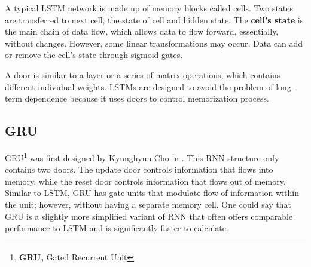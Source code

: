 A typical LSTM network is made up of memory blocks called cells. Two states are transferred to next cell, the state of cell and hidden state. The \textbf{cell's state} is the main chain of data flow, which allows data to flow forward, essentially, without changes. However, some linear transformations may occur. Data can add or remove the cell's state through sigmoid gates.

\vspace{5mm} %

A door is similar to a layer or a series of matrix operations, which contains different individual weights. LSTMs are designed to avoid the problem of long-term dependence because it uses doors to control memorization process.

\subsection{GRU}

GRU\footnote{\textbf{GRU, }Gated Recurrent Unit} was first designed by Kyunghyun Cho in \citeyear{Reference55}. This RNN structure only contains two doors. The update door controls information that flows into memory, while the reset door controls information that flows out of memory. Similar to LSTM, GRU has gate units that modulate flow of information within the unit; however, without having a separate memory cell. One could say that GRU is a slightly more simplified variant of RNN that often offers comparable performance to LSTM and is significantly faster to calculate.

